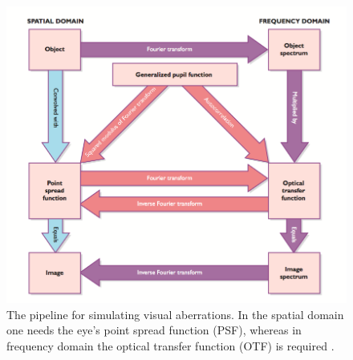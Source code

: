 \begin{figure}[h]
	\centering
	\includegraphics[width=1.0\linewidth]{__Images/04/roadmap.png}
	\caption[A roadmap for Fourier optics]{The pipeline for simulating visual aberrations. In the spatial domain one needs the eye's point spread function (PSF), whereas in frequency domain the optical transfer function (OTF) is required \cite{Mollon2003}.} 
	\label{fig:roadmap}
\end{figure}












	

